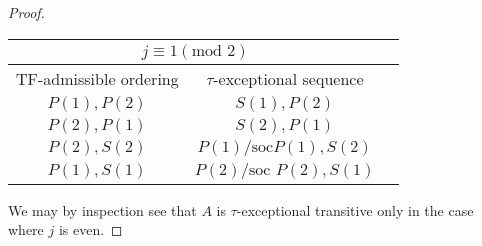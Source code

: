 \documentclass[]{article}
\theoremstyle{definition}
\newcommand{\tu}{\ensuremath{\tau}}
\begin{document}
\begin{proof}
	\begin{center}
		\begin{tabular}{ |c|c|c| } 
		\hline
		\multicolumn{2}{|c|}{$j \equiv 1 (\text{mod }2)$} \\
		\hline
		TF-admissible ordering & $\tau$-exceptional sequence \\
		\hline
		$P(1),P(2)$ & $S(1),P(2)$ \\ 
		$P(2),P(1)$ & $S(2),P(1)$ \\ 
		$P(2),S(2)$ & $P(1)/\text{soc}P(1),S(2)$\\ 
		$P(1),S(1)$ & $P(2)/\text{soc }P(2),S(1)$ \\
		\hline
	\end{tabular}
\end{center}
	
	We may by inspection see that $A$ is \tu-exceptional transitive only in the case where $j$ is even.
	
\end{proof}

\printbibliography
\end{document}
